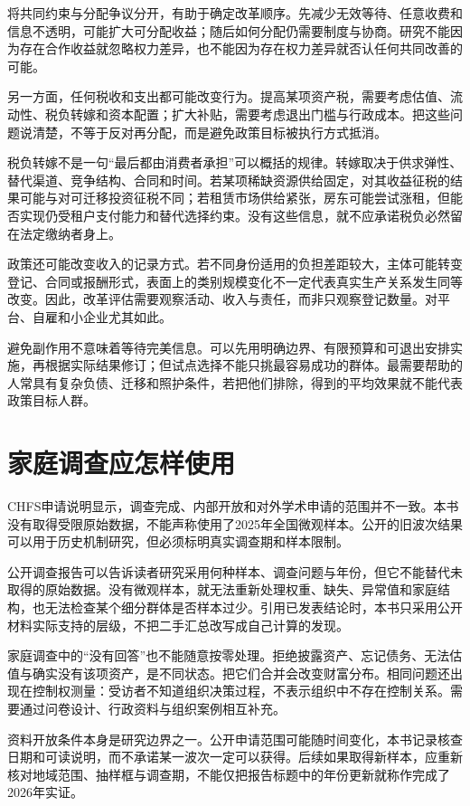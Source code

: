 \documentclass[UTF8,fontset=fandol,zihao=-4,oneside,openany]{ctexbook}
\begin{document}
将共同约束与分配争议分开，有助于确定改革顺序。先减少无效等待、任意收费和信息不透明，可能扩大可分配收益；随后如何分配仍需要制度与协商。研究不能因为存在合作收益就忽略权力差异，也不能因为存在权力差异就否认任何共同改善的可能。

另一方面，任何税收和支出都可能改变行为。提高某项资产税，需要考虑估值、流动性、税负转嫁和资本配置；扩大补贴，需要考虑退出门槛与行政成本。把这些问题说清楚，不等于反对再分配，而是避免政策目标被执行方式抵消。

\label{arg:P177}
税负转嫁不是一句“最后都由消费者承担”可以概括的规律。转嫁取决于供求弹性、替代渠道、竞争结构、合同和时间。若某项稀缺资源供给固定，对其收益征税的结果可能与对可迁移投资征税不同；若租赁市场供给紧张，房东可能尝试涨租，但能否实现仍受租户支付能力和替代选择约束。没有这些信息，就不应承诺税负必然留在法定缴纳者身上。

政策还可能改变收入的记录方式。若不同身份适用的负担差距较大，主体可能转变登记、合同或报酬形式，表面上的类别规模变化不一定代表真实生产关系发生同等改变。因此，改革评估需要观察活动、收入与责任，而非只观察登记数量。对平台、自雇和小企业尤其如此。

避免副作用不意味着等待完美信息。可以先用明确边界、有限预算和可退出安排实施，再根据实际结果修订；但试点选择不能只挑最容易成功的群体。最需要帮助的人常具有复杂负债、迁移和照护条件，若把他们排除，得到的平均效果就不能代表政策目标人群。

\section{家庭调查应怎样使用}
CHFS申请说明显示，调查完成、内部开放和对外学术申请的范围并不一致。本书没有取得受限原始数据，不能声称使用了2025年全国微观样本。公开的旧波次结果可以用于历史机制研究，但必须标明真实调查期和样本限制。\cite{CHFS}

\label{arg:P178}
公开调查报告可以告诉读者研究采用何种样本、调查问题与年份，但它不能替代未取得的原始数据。没有微观样本，就无法重新处理权重、缺失、异常值和家庭结构，也无法检查某个细分群体是否样本过少。引用已发表结论时，本书只采用公开材料实际支持的层级，不把二手汇总改写成自己计算的发现。

家庭调查中的“没有回答”也不能随意按零处理。拒绝披露资产、忘记债务、无法估值与确实没有该项资产，是不同状态。把它们合并会改变财富分布。相同问题还出现在控制权测量：受访者不知道组织决策过程，不表示组织中不存在控制关系。需要通过问卷设计、行政资料与组织案例相互补充。

资料开放条件本身是研究边界之一。公开申请范围可能随时间变化，本书记录核查日期和可读说明，而不承诺某一波次一定可以获得。后续如果取得新样本，应重新核对地域范围、抽样框与调查期，不能仅把报告标题中的年份更新就称作完成了2026年实证。\cite{CHFS}
\end{document}
